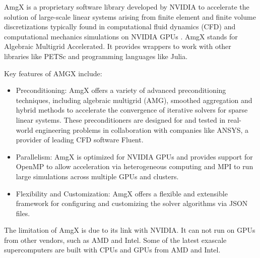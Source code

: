 
AmgX is a proprietary software library developed by NVIDIA to accelerate the solution of large-scale linear systems arising from finite element and finite volume discretizations typically found in computational fluid dynamics (CFD) and computational mechanics simulations on NVIDIA GPUs \citep{doi:10.1137/140980260}.
AmgX stands for Algebraic Multigrid Accelerated.
It provides wrappers to work with other libraries like PETSc and programming languages like Julia.

Key features of AMGX include:
\begin{itemize}
    \item Preconditioning: AmgX offers a variety of advanced preconditioning techniques, including algebraic multigrid (AMG), smoothed aggregation and hybrid methods to accelerate the convergence of iterative solvers for sparse linear systems.
    These preconditioners are designed for and tested in real-world engineering problems in collaboration with companies like ANSYS, a provider of leading CFD software Fluent.
    \item Parallelism: AmgX is optimized for NVIDIA GPUs and provides support for OpenMP to allow acceleration via heterogeneous computing and MPI to run large simulations across multiple GPUs and clusters.
    \item Flexibility and Customization: AmgX offers a flexible and extensible framework for configuring and customizing the solver algorithms via JSON files. 
\end{itemize}
The limitation of AmgX is due to its link with NVIDIA. It can not run on GPUs from other vendors, such as AMD and Intel. Some of the latest exascale supercomputers are built with CPUs and GPUs from AMD and Intel.